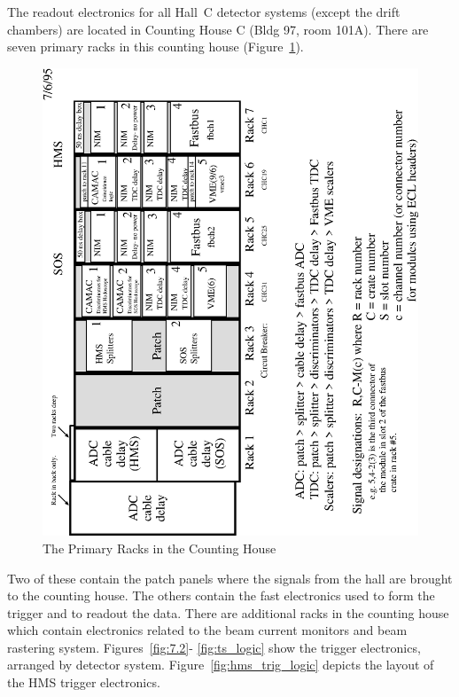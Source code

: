 The readout electronics for all Hall~C detector systems (except the
drift chambers) are located in Counting House C (Bldg 97, room 101A).
There are seven primary racks in this counting house (Figure~\ref{fig:7.1}). 
\begin{figure}
\includegraphics[width=6in]{racks.eps}
\caption{The Primary Racks in the Counting House\label{fig:7.1}}
\end{figure}
Two of these
contain the patch panels where the signals from the hall are
brought to the counting
house. The others contain the fast electronics used to form the trigger and to
readout the data. There are additional racks in the counting house
which contain electronics
related to the beam current monitors and beam rastering system. Figures~\ref{fig:7.2}-
\ref{fig:ts_logic} show the trigger electronics, arranged by detector system. Figure~\ref{fig:hms_trig_logic} depicts
the layout of the HMS trigger electronics.

